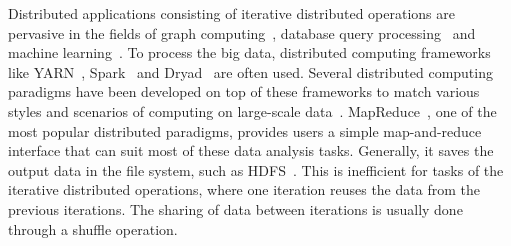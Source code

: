 \documentclass[10pt,journal,compsoc]{IEEEtran}
\begin{document}




% 
% 
% 
% 



Distributed applications consisting of iterative distributed operations are pervasive in the fields of graph computing~\cite{Malewicz:2010:PSL, Lu:2014:LDG}, database query processing~\cite{thusoo2009hive,Yu:2008:DSG,Armbrust:2015:SSR} and machine learning~\cite{low2012distributed,kraska2013mlbase}.
To process the big data,
distributed computing frameworks like YARN~\cite{vavilapalli2013apache},
Spark~\cite{zaharia2012resilient} and Dryad~\cite{isard2007dryad} are often used.
Several distributed computing paradigms have been developed on top of
these frameworks to match various styles and
scenarios of computing on large-scale data~\cite{thusoo2009hive, Yu:2008:DSG}.
MapReduce~\cite{dean2008mapreduce}, one of the most popular
distributed paradigms, provides users a simple map-and-reduce
interface that can suit most of these data analysis tasks.
Generally, it saves the output data in the file system, such as HDFS~\cite{shvachko2010hadoop}. 
This is inefficient for tasks of the iterative distributed operations, where one iteration reuses the data from the previous iterations. The sharing of data between iterations is usually done
through a shuffle operation.
\end{document}
